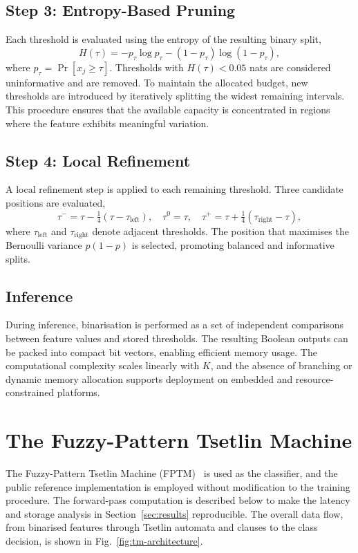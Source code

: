 \documentclass[journal,twoside,web]{ieeecolor}
\begin{document}
\subsection{Step 3: Entropy-Based Pruning}
\label{subsec:entropy}

Each threshold is evaluated using the entropy of the resulting
binary split,
\begin{equation}
  H(\tau) = -p_\tau \log p_\tau - (1-p_\tau)\log(1-p_\tau),
\end{equation}
where $p_\tau = \Pr[x_j \geq \tau]$. Thresholds with
$H(\tau) < 0.05$ nats are considered uninformative and are removed.
To maintain the allocated budget, new thresholds are introduced by
iteratively splitting the widest remaining intervals. This procedure
ensures that the available capacity is concentrated in regions where
the feature exhibits meaningful variation.

\subsection{Step 4: Local Refinement}
\label{subsec:refine}

A local refinement step is applied to each remaining threshold.
Three candidate positions are evaluated,
\begin{equation}
  \tau^{-} = \tau - \tfrac{1}{4}(\tau - \tau_\text{left}), \quad
  \tau^{0} = \tau, \quad
  \tau^{+} = \tau + \tfrac{1}{4}(\tau_\text{right} - \tau),
\end{equation}
where $\tau_\text{left}$ and $\tau_\text{right}$ denote adjacent
thresholds. The position that maximises the Bernoulli variance
$p(1-p)$ is selected, promoting balanced and informative splits.

\subsection{Inference}
\label{subsec:inference}

During inference, binarisation is performed as a set of independent
comparisons between feature values and stored thresholds. The
resulting Boolean outputs can be packed into compact bit vectors,
enabling efficient memory usage. The computational complexity scales
linearly with $K$, and the absence of branching or dynamic memory
allocation supports deployment on embedded and resource-constrained
platforms.


\section{The Fuzzy-Pattern Tsetlin Machine}
\label{sec:fptm}
The Fuzzy-Pattern Tsetlin Machine (FPTM)~\cite{hnilov2025fptm} is
used as the classifier, and the public reference implementation is
employed without modification to the training procedure. The
forward-pass computation is described below to make the latency and
storage analysis in Section~\ref{sec:results} reproducible. The
overall data flow, from binarised features through Tsetlin automata
and clauses to the class decision, is shown in
Fig.~\ref{fig:tm-architecture}.
\end{document}
